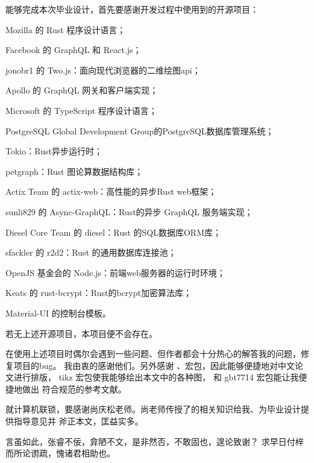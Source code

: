 \begin{arigatou}
    能够完成本次毕业设计，首先要感谢开发过程中使用到的开源项目：

    Mozilla 的 Rust 程序设计语言；

    Facebook 的 GraphQL 和 React.js；

    jonobr1 的 Two.js：面向现代浏览器的二维绘图api；

    Apollo 的 GraphQL 网关和客户端实现；

    Microsoft 的 TypeScript 程序设计语言；

    PostgreSQL Global Development Group的PostgreSQL数据库管理系统；

    Tokio：Rust异步运行时；

    petgraph：Rust 图论算数据结构库；

    Actix Team 的 actix-web：高性能的异步Rust web框架；

    sunli829 的 Async-GraphQL：Rust的异步 GraphQL 服务端实现；

    Diesel Core Team 的 diesel：Rust 的SQL数据库ORM库；

    sfackler 的 r2d2：Rust 的通用数据库连接池；

    OpenJS 基金会的 Node.js：前端web服务器的运行时环境；

    Keats 的 rust-bcrypt：Rust的bcrypt加密算法库；

    Material-UI 的控制台模板。

    若无上述开源项目，本项目便不会存在。

    在使用上述项目时偶尔会遇到一些问题、但作者都会十分热心的解答我的问题，修复项目的bug。
    我由衷的感谢他们。另外感谢 、\CTeX 宏包，因此能够便捷地对中文论文进行排版，
    tikz 宏包使我能够绘出本文中的各种图， 和 gbt7714 宏包能让我便捷地做出
    符合规范的参考文献。

    就计算机联锁，要感谢尚庆松老师。尚老师传授了的相关知识给我、为毕业设计提供指导意见并
    斧正本文，匡益实多。

    言虽如此，张睿不佞，弇陋不文，是非然否，不敢固也，遑论致谢？
    求早日付梓而所论谫疏，愧诸君相助也。
\end{arigatou}